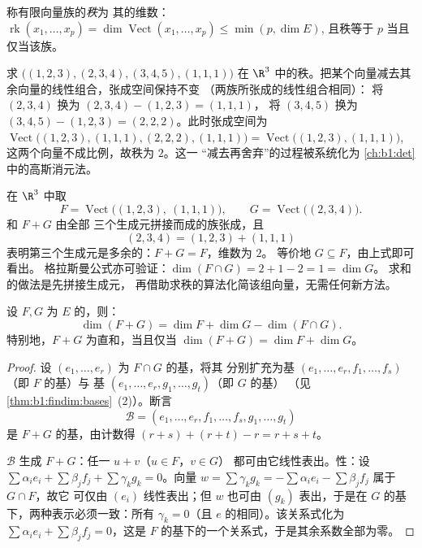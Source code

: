 \begin{definition}[族的秩]\label{def:b1:findim:rank}
称有限向量族的\emph{秩}为
其的维数：
$\operatorname{rk}(x_1, \dots, x_p) = \dim
\operatorname{Vect}(x_1, \dots, x_p) \leq \min(p, \dim E)$,
且秩等于 $p$ 当且仅当该族。
\end{definition}

\begin{example}[用消元法计算秩]
\label{ex:b1:findim:rankcomputation}
求 $\bigl((1,2,3), (2,3,4), (3,4,5), (1,1,1)\bigr)$ 在
$\R^3$ 中的秩。把某个向量减去其余向量的线性组合，张成空间保持不变
（两族所张成的线性组合相同）：
将 $(2,3,4)$ 换为 $(2,3,4) - (1,2,3) = (1,1,1)$，
将 $(3,4,5)$ 换为 $(3,4,5) - (1,2,3) = (2,2,2)$。此时张成空间为
$\operatorname{Vect}\bigl((1,2,3), (1,1,1), (2,2,2),
(1,1,1)\bigr) = \operatorname{Vect}\bigl((1,2,3), (1,1,1)\bigr)$,
这两个向量不成比例，故秩为 $2$。这一
“减去再舍弃”的过程被系统化为
\cref{ch:b1:det}中的高斯消元法。
\end{example}

\begin{example}[通过拼接求和]
\label{ex:b1:findim:sumconcat}
在 $\R^3$ 中取
\[
F = \operatorname{Vect}\bigl((1,2,3),\ (1,1,1)\bigr),
\qquad
G = \operatorname{Vect}\bigl((2,3,4)\bigr) .
\]
和 $F + G$ 由全部
三个生成元拼接而成的族张成，且
\[
(2, 3, 4) = (1, 2, 3) + (1, 1, 1)
\]
表明第三个生成元是多余的：$F + G = F$，维数为 $2$。
等价地 $G \subseteq F$，由上式即可看出。
格拉斯曼公式亦可验证：$\dim(F \cap G) = 2 + 1 - 2 = 1 = \dim G$。
求和的做法是先拼接生成元，
再借助求秩的算法化简该组向量，无需任何新方法。
\end{example}

\begin{theorem}[格拉斯曼公式]\label{thm:b1:findim:grassmann}
设 $F, G$ 为
$E$ 的，则：
\[
\dim(F + G) = \dim F + \dim G - \dim(F \cap G) .
\]
特别地，$F + G$ 为直和，当且仅当 $\dim(F + G) = \dim F + \dim G$。
\end{theorem}

\begin{proof}
设 $(e_1, \dots, e_r)$ 为 $F \cap G$ 的基，将其
分别扩充为基 $(e_1, \dots, e_r, f_1, \dots, f_s)$（即 $F$ 的基）与
基 $(e_1, \dots, e_r, g_1, \dots, g_t)$（即 $G$ 的基）
（见\cref{thm:b1:findim:bases}~(2)）。断言
\[
\mathcal{B} = (e_1, \dots, e_r, f_1, \dots, f_s, g_1, \dots, g_t)
\]
是 $F + G$ 的基，由计数得 $(r + s) +
(r + t) - r = r + s + t$。

$\mathcal{B}$ 生成 $F + G$：任一 $u + v$（$u \in F$，$v \in G$）
都可由它线性表出。性：设 $\sum \alpha_i e_i + \sum
\beta_j f_j + \sum \gamma_k g_k = 0$。向量 $w = \sum \gamma_k
g_k = -\sum\alpha_i e_i - \sum\beta_j f_j$ 属于 $G \cap F$，故它
可仅由 $(e_i)$ 线性表出；但 $w$ 也可由 $(g_k)$ 表出，于是在
$G$ 的基下，两种表示必须一致：所有
$\gamma_k = 0$（且 $e$ 的相同）。该关系式化为
$\sum\alpha_i e_i + \sum\beta_j f_j = 0$，这是
$F$ 的基下的一个关系式，于是其余系数全部为零。
\end{proof}

